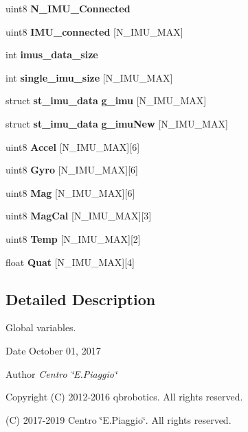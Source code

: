 \begin{DoxyCompactItemize}
uint8 {\bfseries N\+\_\+\+I\+M\+U\+\_\+\+Connected}
\item 
\mbox{\label{globals_8c_a99668f3210aba0be3baec19486621bce}} 
uint8 {\bfseries I\+M\+U\+\_\+connected} [N\+\_\+\+I\+M\+U\+\_\+\+M\+AX]
\item 
\mbox{\label{globals_8c_a86272fcfcab512d38a11824196df4bbc}} 
int {\bfseries imus\+\_\+data\+\_\+size}
\item 
\mbox{\label{globals_8c_aca96c483c3e269e3805aa861ced0aef5}} 
int {\bfseries single\+\_\+imu\+\_\+size} [N\+\_\+\+I\+M\+U\+\_\+\+M\+AX]
\item 
\mbox{\label{globals_8c_ab72cce926a6439eda41315f45a9c379c}} 
struct \textbf{ st\+\_\+imu\+\_\+data} {\bfseries g\+\_\+imu} [N\+\_\+\+I\+M\+U\+\_\+\+M\+AX]
\item 
\mbox{\label{globals_8c_abb00fd907d732c0691940f718e231178}} 
struct \textbf{ st\+\_\+imu\+\_\+data} {\bfseries g\+\_\+imu\+New} [N\+\_\+\+I\+M\+U\+\_\+\+M\+AX]
\item 
\mbox{\label{globals_8c_a187c605f3898cf11e09f6f469c265920}} 
uint8 {\bfseries Accel} [N\+\_\+\+I\+M\+U\+\_\+\+M\+AX][6]
\item 
\mbox{\label{globals_8c_a49dba88a31d1b3b4190065b9ef1649fe}} 
uint8 {\bfseries Gyro} [N\+\_\+\+I\+M\+U\+\_\+\+M\+AX][6]
\item 
\mbox{\label{globals_8c_a5d88408ccb73729f049a52b4d1daaadf}} 
uint8 {\bfseries Mag} [N\+\_\+\+I\+M\+U\+\_\+\+M\+AX][6]
\item 
\mbox{\label{globals_8c_a1e598e1bdae5fe927fbd1f396161f3a6}} 
uint8 {\bfseries Mag\+Cal} [N\+\_\+\+I\+M\+U\+\_\+\+M\+AX][3]
\item 
\mbox{\label{globals_8c_af5f2d49e123a057d358297a34194ebdc}} 
uint8 {\bfseries Temp} [N\+\_\+\+I\+M\+U\+\_\+\+M\+AX][2]
\item 
\mbox{\label{globals_8c_a79179edea7394e7176f8768b1b0f6f92}} 
float {\bfseries Quat} [N\+\_\+\+I\+M\+U\+\_\+\+M\+AX][4]
\end{DoxyCompactItemize}


\subsection{Detailed Description}
Global variables. 

\begin{DoxyDate}{Date}
October 01, 2017 
\end{DoxyDate}
\begin{DoxyAuthor}{Author}
{\itshape Centro \char`\"{}\+E.\+Piaggio\char`\"{}} 
\end{DoxyAuthor}
\begin{DoxyCopyright}{Copyright}
(C) 2012-\/2016 qbrobotics. All rights reserved. 

(C) 2017-\/2019 Centro \char`\"{}\+E.\+Piaggio\char`\"{}. All rights reserved. 
\end{DoxyCopyright}


